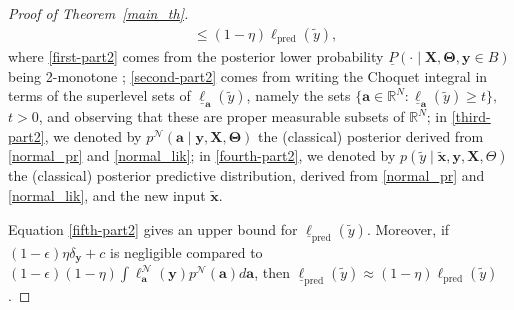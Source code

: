 \documentclass[12pt, english, oneside, a4paper]{article}
\newcommand{\y}{\boldsymbol{y}}
\newcommand{\X}{\boldsymbol{X}}
\newcommand{\x}{\boldsymbol{x}}
\renewcommand{\a}{\boldsymbol{a}}
\newcommand{\bT}{\boldsymbol{\Theta}}
\begin{document}
\begin{proof}[Proof of Theorem~\ref{main_th}]
\begin{align}
   &\leq (1-\eta) \ell_\text{pred}(\tilde{y}), \label{fifth-part2}
\end{align}
where \eqref{first-part2} comes from the posterior lower probability $\underline{P}(\cdot \mid \X,\bT,\y\in B)$ being 2-monotone \citep{wasserman,novel_Bayes}; 
\eqref{second-part2} comes from writing the Choquet integral in terms of the superlevel sets of $\underline{\ell}_{\a}(\tilde y)$, namely the sets
\(
\{\a\in\mathbb{R}^N:\underline{\ell}_{\a}(\tilde y)\ge t\},
\)
$t >0$, and observing that these are proper measurable subsets of $\mathbb{R}^N$; in \eqref{third-part2}, we denoted by $p^\mathcal{N}(\a \mid \y, \X,\bT)$ the (classical) posterior derived from \eqref{normal_pr} and \eqref{normal_lik}; in \eqref{fourth-part2}, we denoted by $p(\tilde{y} \mid \tilde{\x},\y,\X,\Theta)$ the (classical) posterior predictive distribution, derived from \eqref{normal_pr} and \eqref{normal_lik}, and the new input $\tilde{\x}$. 


Equation \eqref{fifth-part2} gives an upper bound for $\underline{\ell}_\text{pred}(\tilde{y})$.
Moreover, if $(1-\epsilon)\eta \delta_{\y}+c$ is negligible compared to
$(1-\epsilon)(1-\eta)\int \ell^\mathcal{N}_{\a}(\y)p^\mathcal{N}(\a) d\a$,
then $\underline{\ell}_\text{pred}(\tilde{y}) \approx (1-\eta)\ell_\text{pred}(\tilde{y})$.
\end{proof}
\end{document}
